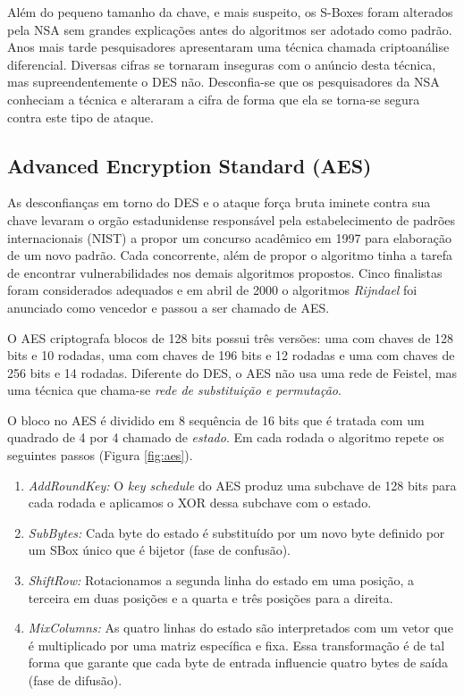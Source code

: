 
Além do pequeno tamanho da chave, e mais suspeito, os S-Boxes foram alterados pela NSA sem grandes explicações antes do algoritmos ser adotado como padrão.
Anos mais tarde pesquisadores apresentaram uma técnica chamada criptoanálise diferencial.
Diversas cifras se tornaram inseguras com o anúncio desta técnica, mas supreendentemente o DES não.
Desconfia-se que os pesquisadores da NSA conheciam a técnica e alteraram a cifra de forma que ela se torna-se segura contra este tipo de ataque.

\subsection{Advanced Encryption Standard (AES)}
\label{sec:aes}

As desconfianças em torno do DES e o ataque força bruta iminete contra sua chave levaram o orgão estadunidense responsável pela estabelecimento de padrões internacionais (NIST) a propor um concurso acadêmico em 1997 para elaboração de um novo padrão.
Cada concorrente, além de propor o algoritmo tinha a tarefa de encontrar vulnerabilidades nos demais algoritmos propostos.
Cinco finalistas foram considerados adequados e em abril de 2000 o algoritmos {\em Rijndael} foi anunciado como vencedor e passou a ser chamado de AES.

O AES criptografa blocos de 128 bits possui três versões: uma com chaves de 128 bits e 10 rodadas, uma com chaves de 196 bits e 12 rodadas e uma com chaves de 256 bits e 14 rodadas.
Diferente do DES, o AES não usa uma rede de Feistel, mas uma técnica que chama-se {\em rede de substituição e permutação}.

O bloco no AES é dividido em 8 sequência de 16 bits que é tratada com um quadrado de 4 por 4 chamado de {\em estado}.
Em cada rodada o algoritmo repete os seguintes passos (Figura \ref{fig:aes}).

\begin{enumerate}
\item {\em AddRoundKey:} O {\em key schedule} do AES produz uma subchave de 128 bits para cada rodada e aplicamos o XOR dessa subchave com o estado.
\item {\em SubBytes:} Cada byte do estado é substituído por um novo byte definido por um SBox único que é bijetor (fase de confusão).
\item {\em ShiftRow:} Rotacionamos a segunda linha do estado em uma posição, a terceira em duas posições e a quarta e três posições para a direita.
\item {\em MixColumns:} As quatro linhas do estado são interpretados com um vetor que é multiplicado por uma matriz específica e fixa. Essa transformação é de tal forma que garante que cada byte de entrada influencie quatro bytes de saída (fase de difusão). 
\end{enumerate}

